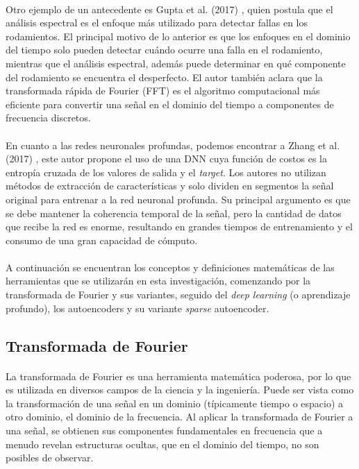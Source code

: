 \documentclass[12pt]{article}
\begin{document}
\paragraph{}
Otro ejemplo de un antecedente es Gupta et al. (2017) \cite{kanpaj}, quien postula que el análisis espectral es el enfoque más utilizado para detectar fallas en los rodamientos. El principal motivo de lo anterior es que los enfoques en el dominio del tiempo solo pueden detectar cuándo ocurre una falla en el rodamiento, mientras que el análisis espectral, además puede determinar en qué componente del rodamiento se encuentra el desperfecto. El autor también aclara que la transformada rápida de Fourier (FFT) es el algoritmo computacional más eficiente para convertir una señal en el dominio del tiempo a componentes de frecuencia discretos.

\paragraph{}
En cuanto a las redes neuronales profundas, podemos encontrar a Zhang et al. (2017) \cite{ran}, este autor  propone el uso de una DNN cuya función de costos es la entropía cruzada de los valores de salida y el \textit{target}. Los autores no utilizan métodos de extracción de características y solo dividen en segmentos la señal original para entrenar a la red neuronal profunda. Su principal argumento es que se debe mantener la coherencia temporal de la señal, pero la cantidad de datos que recibe la red es enorme, resultando en grandes tiempos de entrenamiento y el consumo de una gran capacidad de cómputo.

\paragraph{}
A continuación se encuentran los conceptos y definiciones matemáticas de las herramientas que se utilizarán en esta investigación, comenzando por la transformada de Fourier y sus variantes, seguido del \textit{deep learning} (o aprendizaje profundo), los autoencoders y su variante \textit{sparse} autoencoder.

\subsection{Transformada de Fourier}
\paragraph{}
La transformada de Fourier es una herramienta matemática poderosa, por lo que es utilizada en diversos campos de la ciencia y la ingeniería. Puede ser vista como la transformación de una señal en un dominio (típicamente tiempo o espacio) a otro dominio, el dominio de la frecuencia. Al aplicar la transformada de Fourier a una señal, se obtienen sus componentes fundamentales en frecuencia que a menudo revelan estructuras ocultas, que en el dominio del tiempo, no son posibles de observar.
\end{document}

